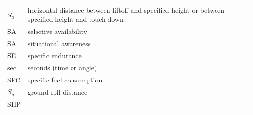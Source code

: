 \documentclass[
]{book}
\begin{document}
\begin{longtable}[]{@{}ll@{}}
\begin{minipage}[t]{0.47\columnwidth}
\(S_a\)\strut
\end{minipage} & \begin{minipage}[t]{0.47\columnwidth}\raggedright
horizontal distance between liftoff and specified height or between specified height and touch down\strut
\end{minipage}\tabularnewline
\begin{minipage}[t]{0.47\columnwidth}\raggedright
SA\strut
\end{minipage} & \begin{minipage}[t]{0.47\columnwidth}\raggedright
selective availability\strut
\end{minipage}\tabularnewline
\begin{minipage}[t]{0.47\columnwidth}\raggedright
SA\strut
\end{minipage} & \begin{minipage}[t]{0.47\columnwidth}\raggedright
situational awareness\strut
\end{minipage}\tabularnewline
\begin{minipage}[t]{0.47\columnwidth}\raggedright
SE\strut
\end{minipage} & \begin{minipage}[t]{0.47\columnwidth}\raggedright
specific endurance\strut
\end{minipage}\tabularnewline
\begin{minipage}[t]{0.47\columnwidth}\raggedright
sec\strut
\end{minipage} & \begin{minipage}[t]{0.47\columnwidth}\raggedright
seconds (time or angle)\strut
\end{minipage}\tabularnewline
\begin{minipage}[t]{0.47\columnwidth}\raggedright
SFC\strut
\end{minipage} & \begin{minipage}[t]{0.47\columnwidth}\raggedright
specific fuel consumption\strut
\end{minipage}\tabularnewline
\begin{minipage}[t]{0.47\columnwidth}\raggedright
\(S_g\)\strut
\end{minipage} & \begin{minipage}[t]{0.47\columnwidth}\raggedright
ground roll distance\strut
\end{minipage}\tabularnewline
\begin{minipage}[t]{0.47\columnwidth}\raggedright
SHP\strut
\end{minipage} & \begin{minipage}[t]{0.47\columnwidth}\raggedright

\end{minipage}
\end{longtable}
\end{document}
